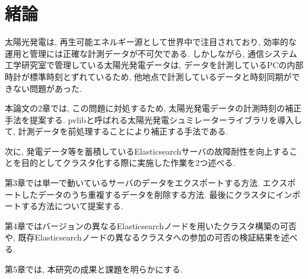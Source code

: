 \chapter{緒論}
\label{chap:first}

太陽光発電は, 再生可能エネルギー源として世界中で注目されており, 効率的な運用と管理には正確な計測データが不可欠である. しかしながら, 通信システム工学研究室で管理している太陽光発電データは, データを計測しているPCの内部時計が標準時刻とずれているため, 他地点で計測しているデータと時刻同期ができない問題があった.

本論文の2章では, この問題に対処するため, 太陽光発電データの計測時刻の補正手法を提案する. pvlibと呼ばれる太陽光発電シュミレーターライブラリを導入して, 計測データを前処理することにより補正する手法である.

次に, 発電データ等を蓄積しているElasticsearchサーバの故障耐性を向上することを目的としてクラスタ化する際に実施した作業を2つ述べる.

第3章では単一で動いているサーバのデータをエクスポートする方法. エクスポートしたデータのうち重複するデータを削除する方法. 最後にクラスタにインポートする方法について提案する.

第4章ではバージョンの異なるElasticsearchノードを用いたクラスタ構築の可否や, 既存Elasticsearchノードの異なるクラスタへの参加の可否の検証結果を述べる. 

第5章では, 本研究の成果と課題を明らかにする.